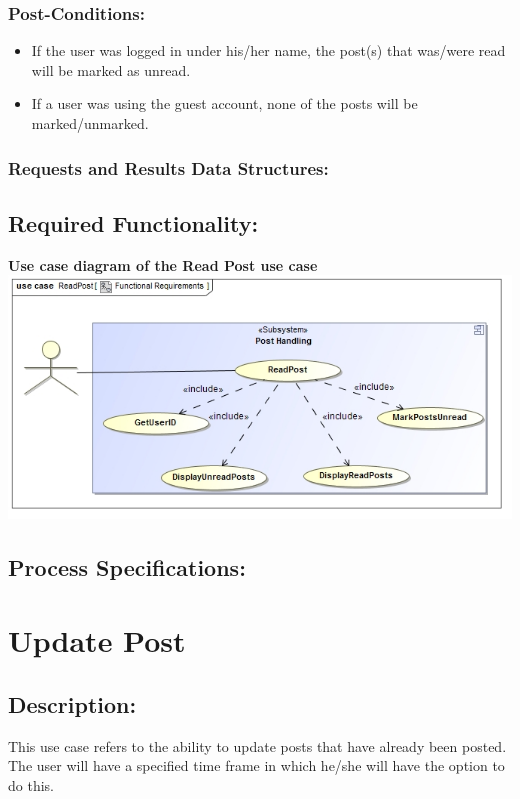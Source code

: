 \documentclass[a4paper,11pt]{article}
\begin{document}
\subsubsection*{Post-Conditions:}
\begin{itemize}
	\item If the user was logged in under his/her name, the post(s) that was/were read will be marked as unread.
	\item If a user was using the guest account, none of the posts will be marked/unmarked.
\end{itemize}
\subsubsection*{Requests and Results Data Structures:}
\subsection{Required Functionality:} 
\textbf{Use case diagram of the Read Post use case}\\
\includegraphics[width=1\linewidth]{./Images/PostHandling/postRead.jpg}\\
\subsection{Process Specifications:} 

\section{Update Post}
\subsection*{Description:}This use case refers to the ability to update posts that have already been posted. The user will have a specified time frame in which he/she will have the option to do this.  
\end{document}
